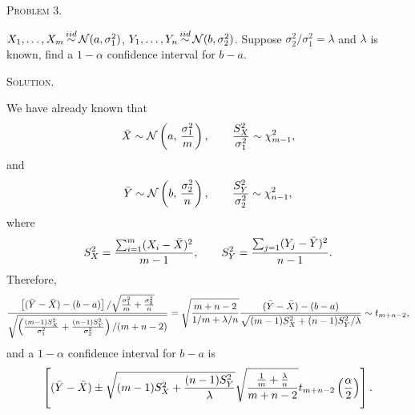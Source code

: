 \documentclass{article}
\begin{document}
\begin{CJK}{UTF8}{gbsn}
    \begin{shaded}
        \noindent\textsc{Problem 3.}\par
        $X_1, \ldots, X_m \mathop{\sim}\limits^{iid}{\mathcal N}(a, \sigma_1^2)$, $Y_1, \ldots, Y_n\mathop{\sim}\limits^{iid}{\mathcal N}(b, \sigma_2^2)$.
        Suppose $\sigma_2^2/\sigma_1^2=\lambda$ and $\lambda$ is known, find a $1-\alpha$ confidence interval for $b-a$.
    \end{shaded}
    \noindent\textsc{Solution.}\par
    We have already known that
    \begin{align}
        \bar{X} \sim {\mathcal N}\left (a,\, \frac{\sigma_1^2}{m} \right ), \qquad \frac{S_X^2}{\sigma_1^2} \sim \chi^2_{m-1}, \notag
    \end{align}
    and
    \begin{align}
        \bar{Y} \sim {\mathcal N}\left (b,\, \frac{\sigma_2^2}{n} \right ), \qquad \frac{S_Y^2}{\sigma_2^2} \sim \chi^2_{n-1}, \notag
    \end{align}
    where
    \begin{align}
        S_X^2 = \frac{\sum_{i=1}^m (X_i-\bar{X})^2}{m-1}, \qquad S_Y^2 =\frac{\sum_{j=1}(Y_j-\bar{Y})^2}{n-1}.\notag
    \end{align}
    Therefore,
    \begin{align}
        \frac{\left [ (\bar{Y}-\bar{X}) - (b-a) \right ] / \sqrt{\frac{\sigma_1^2}{m} + \frac{\sigma_2^2}{n}}}{\sqrt{\left ( \frac{(m-1)S_X^2}{\sigma_1^2} + \frac{(n-1)S_Y^2}{\sigma_2^2} \right ) / (m+n-2)}} =
        \sqrt{\frac{m+n-2}{1/m+\lambda /n}} \frac{(\bar{Y}-\bar{X}) - (b-a)}{\sqrt{(m-1)S_X^2 + (n-1)S_Y^2/\lambda}} \sim t_{m+n-2},\notag
    \end{align}
    and a $1-\alpha$ confidence interval for $b-a$ is
    \begin{align}
        \left [ (\bar{Y} - \bar{X}) \pm \sqrt{(m-1)S_X^2 + \frac{(n-1)S_Y^2}{\lambda}}\sqrt{\frac{\frac{1}{m}+\frac{\lambda}{n}}{m+n-2}} t_{m+n-2}\left (\frac{\alpha}{2}\right )\right ].\notag
    \end{align}







\end{CJK}
\end{document}
